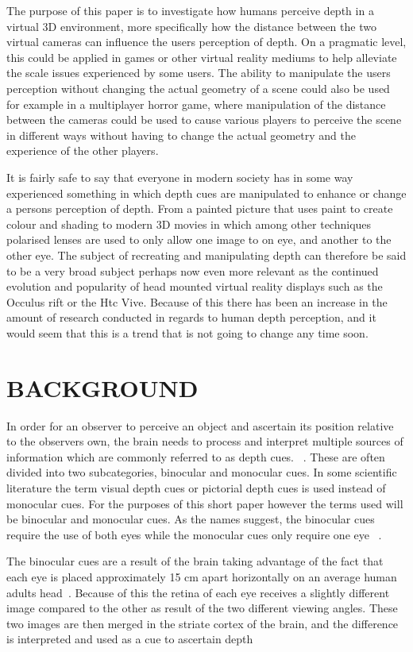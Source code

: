 \documentclass[tog]{acmsiggraph}
\begin{document}
The purpose of this paper is to investigate how humans perceive depth in a virtual 3D environment, more specifically how the distance between the two virtual cameras can influence the users perception of depth. On a pragmatic level, this could be applied in games or other virtual reality mediums to help alleviate the scale issues experienced by some users. The ability to manipulate the users perception without changing the actual geometry of a scene could also be used for example in a multiplayer horror game, where manipulation of the distance between the cameras could be used to cause various players to perceive the scene in different ways without having to change the actual geometry and the experience of the other players.

It is fairly safe to say that everyone in modern society has in some way experienced something in which depth cues are manipulated to enhance or change a persons perception of depth. From a painted picture that uses paint to create colour and shading to modern 3D movies in which among other techniques polarised lenses are used to only allow one image to on eye, and another to the other eye. The subject of recreating and manipulating depth can therefore be said to be a very broad subject perhaps now even more relevant as the continued evolution and popularity of head mounted virtual reality displays such as the Occulus rift or the Htc Vive. Because of this there has been an increase in the amount of research conducted in regards to human depth perception, and it would seem that this is a trend that is not going to change any time soon.  


\section{BACKGROUND}
In order for an observer to perceive an object and ascertain its position relative to the observers own, the brain needs to process and interpret multiple sources of information which are commonly referred to as depth cues. ~\cite {Reichelt et al:2010:DPHV}. These are often divided into two subcategories, binocular and monocular cues. In some scientific literature the term visual depth cues or pictorial depth cues is used instead of monocular cues. For the purposes of this short paper however the terms used will be binocular and monocular cues. As the names suggest, the binocular cues require the use of both eyes while the monocular cues only require one eye ~\cite {Pfautz:2002:DPCG}.

The binocular cues are a result of the brain taking advantage of the fact that each eye is placed approximately 15 cm apart horizontally on an average human adults head~\cite {Akai:1998:DPIRVR}. Because of this the retina of each eye receives a slightly different image compared to the other as result of the two different viewing angles. These two images are then merged in the striate cortex of the brain, and the difference is interpreted and used as a cue to ascertain depth ~\cite{Reichelt et al:2010:DPHV} 
\end{document}
